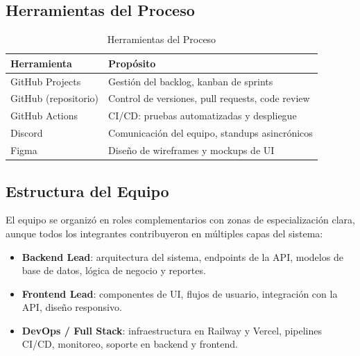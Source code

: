 \subsection{Herramientas del Proceso}\label{herramientas-del-proceso}

\begin{longtable}[]{@{}
  >{\raggedright\arraybackslash}p{}
  >{\raggedright\arraybackslash}p{}@{}}
\caption[Herramientas del Proceso]{Herramientas del Proceso}\tabularnewline
\toprule\noalign{}
\begin{minipage}[b]{\linewidth}\raggedright
Herramienta
\end{minipage} & \begin{minipage}[b]{\linewidth}\raggedright
Propósito
\end{minipage} \\
\midrule\noalign{}
\endhead
\bottomrule\noalign{}
\endlastfoot
GitHub Projects & Gestión del backlog, kanban de sprints \\
GitHub (repositorio) & Control de versiones, pull requests, code review \\
GitHub Actions & CI/CD: pruebas automatizadas y despliegue \\
Discord & Comunicación del equipo, standups asincrónicos \\
Figma & Diseño de wireframes y mockups de UI \\
\end{longtable}

\subsection{Estructura del Equipo}\label{estructura-del-equipo}

El equipo se organizó en roles complementarios con zonas de especialización clara, aunque todos los integrantes contribuyeron en múltiples capas del sistema:

\begin{itemize}
\tightlist
\item
  \textbf{Backend Lead}: arquitectura del sistema, endpoints de la API, modelos de base de datos, lógica de negocio y reportes.
\item
  \textbf{Frontend Lead}: componentes de UI, flujos de usuario, integración con la API, diseño responsivo.
\item
  \textbf{DevOps / Full Stack}: infraestructura en Railway y Vercel, pipelines CI/CD, monitoreo, soporte en backend y frontend.
\end{itemize}

